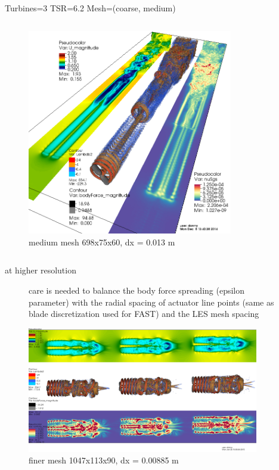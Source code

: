 \documentclass[xcolor=x11names,compress]{beamer}
\begin{document}
\begin{frame}{Turbines=3  TSR=6.2  Mesh=(coarse, medium)}
\begin{columns}
		    \begin{column}{0.6\textwidth}
		        \begin{figure}[p]
				    \centering
				    \includegraphics[width=0.8\textwidth]{figures/fastFlume__Turbines=3_TSR=6p2_Layout=offset_Mesh=medium.png}
				    \caption{\scriptsize{medium mesh 698x75x60, dx = 0.013 m}}
				\end{figure}

		    \end{column}

		\end{columns}

	\end{frame}


	\begin{frame}{at higher resolution}

		\begin{figure}[p]
		    \centering
    		
    		\small care is needed to balance the body force spreading (epsilon parameter) with the 
    		radial spacing of actuator line points (same as blade discretization used for FAST)
    		and the LES mesh spacing

    		\includegraphics[width=0.90\textwidth]{figures/fastFlume__Turbines=3_TSR=6p2_Layout=offset_Mesh=fine_v0000.png}
			\caption{\scriptsize{finer mesh 1047x113x90, dx = 0.00885 m}}
			
		\end{figure}

	\end{frame}
\end{document}
